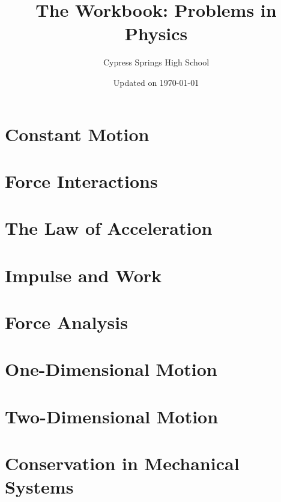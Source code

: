 \documentclass[]{exam}
\title{The Workbook: Problems in Physics}
\author{Cypress Springs High School}
\date{Updated on \today}
\newif\ifShowUnitI       %
\newif\ifShowUnitII      %
\newif\ifShowUnitIII     %
\newif\ifShowUnitIV      %
\newif\ifShowUnitV       %
\newif\ifShowUnitVI      %
\newif\ifShowUnitVII     %
\begin{document}
\maketitle

\section{Constant Motion}

\ifShowUnitI

\fi

\section{Force Interactions}

\ifShowUnitII

\fi

\section{The Law of Acceleration}

\ifShowUnitIII

\fi

\section{Impulse and Work}

\ifShowUnitIV

\fi

\section{Force Analysis}

\ifShowUnitV

\fi

\section{One-Dimensional Motion}

\ifShowUnitVI

\fi

\section{Two-Dimensional Motion}

\ifShowUnitVII

\fi

\section{Conservation in Mechanical Systems}
\end{document}
